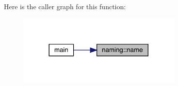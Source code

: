 Here is the caller graph for this function\+:
\nopagebreak
\begin{figure}[H]
\begin{center}
\leavevmode
\includegraphics[width=233pt]{d4/da2/namespacenaming_a0be3b30603f24f1e39a06c9a0fbdca7e_icgraph}
\end{center}
\end{figure}
